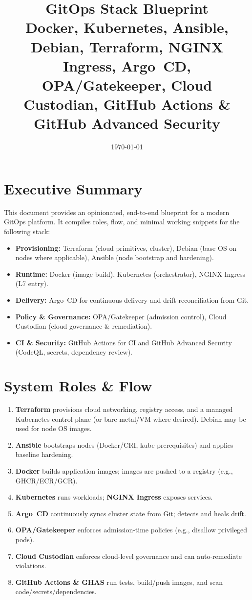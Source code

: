 \documentclass[11pt]{article}
\title{\textbf{GitOps Stack Blueprint}\\
\large Docker, Kubernetes, Ansible, Debian, Terraform, NGINX Ingress, Argo~CD, OPA/Gatekeeper, Cloud Custodian, GitHub Actions \& GitHub Advanced Security}
\author{}
\date{\today}
\begin{document}
\maketitle
\onehalfspacing
\tableofcontents
\newpage

\section{Executive Summary}
This document provides an opinionated, end-to-end blueprint for a modern GitOps platform. It compiles roles, flow, and minimal working snippets for the following stack:
\begin{itemize}[leftmargin=2em]
  \item \textbf{Provisioning:} Terraform (cloud primitives, cluster), Debian (base OS on nodes where applicable), Ansible (node bootstrap and hardening).
  \item \textbf{Runtime:} Docker (image build), Kubernetes (orchestrator), NGINX Ingress (L7 entry).
  \item \textbf{Delivery:} Argo~CD for continuous delivery and drift reconciliation from Git.
  \item \textbf{Policy \& Governance:} OPA/Gatekeeper (admission control), Cloud Custodian (cloud governance \& remediation).
  \item \textbf{CI \& Security:} GitHub Actions for CI and GitHub Advanced Security (CodeQL, secrets, dependency review).
\end{itemize}

\section{System Roles \& Flow}
\begin{enumerate}[leftmargin=2em,label=\textbf{Step \arabic*.}]
  \item \textbf{Terraform} provisions cloud networking, registry access, and a managed Kubernetes control plane (or bare metal/VM where desired). Debian may be used for node OS images.
  \item \textbf{Ansible} bootstraps nodes (Docker/CRI, kube prerequisites) and applies baseline hardening.
  \item \textbf{Docker} builds application images; images are pushed to a registry (e.g., GHCR/ECR/GCR).
  \item \textbf{Kubernetes} runs workloads; \textbf{NGINX Ingress} exposes services.
  \item \textbf{Argo~CD} continuously syncs cluster state from Git; detects and heals drift.
  \item \textbf{OPA/Gatekeeper} enforces admission-time policies (e.g., disallow privileged pods).
  \item \textbf{Cloud Custodian} enforces cloud-level governance and can auto-remediate violations.
  \item \textbf{GitHub Actions \& GHAS} run tests, build/push images, and scan code/secrets/dependencies.
\end{enumerate}
\end{document}

